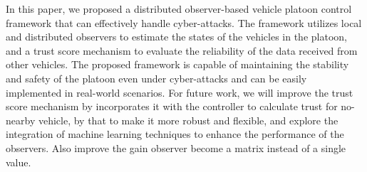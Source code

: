 \documentclass[letterpaper, 10pt, conference]{ieeeconf}  %
\begin{document}
In this paper, we proposed a distributed observer-based vehicle platoon control framework that can effectively handle cyber-attacks. 
The framework utilizes local and distributed observers to estimate the states of the vehicles in the platoon, 
and a trust score mechanism to evaluate the reliability of the data received from other vehicles.
The proposed framework is capable of maintaining the stability and safety of the platoon even under cyber-attacks and can be easily implemented in real-world scenarios.
For future work, we will improve the trust score mechanism by incorporates it with the controller to calculate trust for no-nearby vehicle, by that to make it more robust and flexible, and explore the integration of machine learning techniques to enhance the performance of the observers. Also improve the gain observer become a matrix instead of a single value. 





\newpage
\appendix
\end{document}
